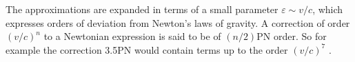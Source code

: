 \documentclass[english, oneside]{HYgradu}
\begin{document}
%
%
%
%
The approximations are expanded in terms of a small parameter $\varepsilon \sim v/c$, which expresses orders of deviation from Newton's laws of gravity. A correction of order $(v/c)^n$ to a Newtonian expression is said to be of $(n/2)\mathrm{PN}$ order. So for example the correction 3.5PN would contain terms up to the order $(v/c)^7$ \citep{will:2006}.
\end{document}
